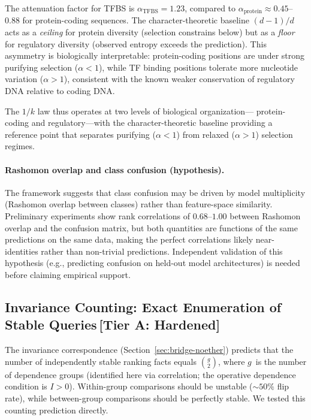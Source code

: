 \documentclass[11pt,a4paper]{article}
\begin{document}
The attenuation factor for TFBS is $\alpha_{\text{TFBS}} = 1.23$, compared
to $\alpha_{\text{protein}} \approx 0.45$--$0.88$ for protein-coding
sequences.  The character-theoretic baseline $(d{-}1)/d$ acts as a
\emph{ceiling} for protein diversity (selection constrains below) but as a
\emph{floor} for regulatory diversity (observed entropy exceeds the
prediction).  This asymmetry is biologically interpretable: protein-coding
positions are under strong purifying selection ($\alpha < 1$), while TF
binding positions tolerate more nucleotide variation ($\alpha > 1$),
consistent with the known weaker conservation of regulatory DNA relative
to coding DNA.

The $1/k$ law thus operates at two levels of biological organization---
protein-coding and regulatory---with the character-theoretic baseline
providing a reference point that separates purifying ($\alpha < 1$) from
relaxed ($\alpha > 1$) selection regimes.

\paragraph{Rashomon overlap and class confusion (hypothesis).}
\label{sec:confusion-rashomon}
The framework suggests that class confusion may be driven by model
multiplicity (Rashomon overlap between classes) rather than feature-space
similarity.  Preliminary experiments show rank correlations of $0.68$--$1.00$
between Rashomon overlap and the confusion matrix, but both quantities are
functions of the same predictions on the same data, making the perfect
correlations likely near-identities rather than non-trivial predictions.
Independent validation of this hypothesis (e.g., predicting confusion on
held-out model architectures) is needed before claiming empirical support.

\subsection{Invariance Counting: Exact Enumeration of Stable Queries\,\textnormal{\normalsize[Tier A: Hardened]}}
\label{sec:noether-counting}

The invariance correspondence (Section~\ref{sec:bridge-noether}) predicts that
the number of independently stable ranking facts equals $\binom{g}{2}$, where
$g$~is the number of dependence groups (identified here via correlation; the operative dependence condition is $I > 0$).  Within-group comparisons should be
unstable ($\sim\!50\%$ flip rate), while between-group comparisons should be
perfectly stable.  We tested this counting prediction directly.
\end{document}
